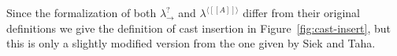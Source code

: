 Since the formalization of both $\lambda^?_\to$ and $\lambda^{\langle
  [[A]] \rangle}$ differ from their original definitions we give the
definition of cast insertion in Figure~\ref{fig:cast-insert}, but this
is only a slightly modified version from the one given by Siek and
Taha.


